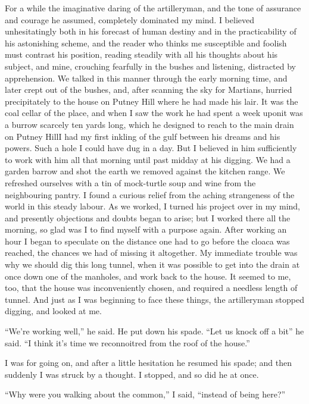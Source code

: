 For a while the imaginative daring of the artilleryman, and the
tone of assurance and courage he assumed, completely dominated my
mind. I believed unhesitatingly both in his forecast of human
destiny and in the practicability of his astonishing scheme, and
the reader who thinks me susceptible and foolish must contrast his
position, reading steadily with all his thoughts about his subject,
and mine, crouching fearfully in the bushes and listening,
distracted by apprehension. We talked in this manner through the
early morning time, and later crept out of the bushes, and, after
scanning the sky for Martians, hurried precipitately to the house
on Putney Hill where he had made his lair. It was the coal cellar
of the place, and when I saw the work he had spent a week upon\dash{}it
was a burrow scarcely ten yards long, which he designed to reach to
the main drain on Putney Hill\dash{}I had my first inkling of the gulf
between his dreams and his powers. Such a hole I could have dug in
a day. But I believed in him sufficiently to work with him all that
morning until past midday at his digging. We had a garden barrow
and shot the earth we removed against the kitchen range. We
refreshed ourselves with a tin of mock-turtle soup and wine from
the neighbouring pantry. I found a curious relief from the aching
strangeness of the world in this steady labour. As we worked, I
turned his project over in my mind, and presently objections and
doubts began to arise; but I worked there all the morning, so glad
was I to find myself with a purpose again. After working an hour I
began to speculate on the distance one had to go before the cloaca
was reached, the chances we had of missing it altogether. My
immediate trouble was why we should dig this long tunnel, when it
was possible to get into the drain at once down one of the
manholes, and work back to the house. It seemed to me, too, that
the house was inconveniently chosen, and required a needless length
of tunnel. And just as I was beginning to face these things, the
artilleryman stopped digging, and looked at me.

``We're working well,'' he said. He put down his spade. ``Let us knock
off a bit'' he said. ``I think it's time we reconnoitred from the
roof of the house.''

I was for going on, and after a little hesitation he resumed his
spade; and then suddenly I was struck by a thought. I stopped, and
so did he at once.

``Why were you walking about the common,'' I said, ``instead of being
here?''

